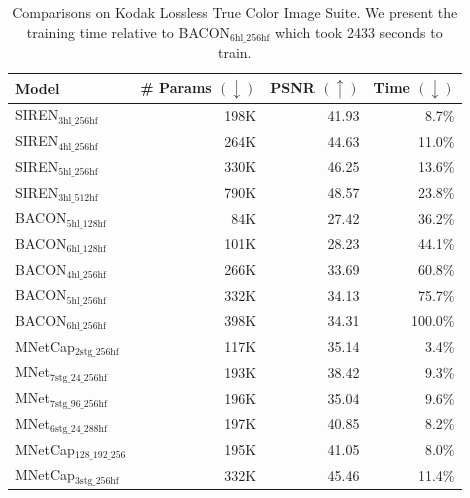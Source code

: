 \begin{table}[!h]
\centering
\small
\begin{tabular}{|l|r|r|r|}
\hline
Model                    & \# Params $(\downarrow)$ & PSNR $(\uparrow)$ & Time $(\downarrow)$ \\
\hline
SIREN$_\text{3hl\_256hf}$        & 198K      & 41.93    & 8.7\%       \\
SIREN$_\text{4hl\_256hf}$        & 264K      & 44.63    & 11.0\%      \\
SIREN$_\text{5hl\_256hf}$        & 330K      & 46.25    & 13.6\%      \\
SIREN$_\text{3hl\_512hf}$        & 790K      & 48.57    & 23.8\%      \\
\hline
BACON$_\text{5hl\_128hf}$        & 84K       & 27.42    & 36.2\%      \\
BACON$_\text{6hl\_128hf}$        & 101K      & 28.23    & 44.1\%      \\
BACON$_\text{4hl\_256hf}$        & 266K      & 33.69    & 60.8\%      \\
BACON$_\text{5hl\_256hf}$        & 332K      & 34.13    & 75.7\%      \\
BACON$_\text{6hl\_256hf}$        & 398K      & 34.31    & 100.0\%     \\
\hline
MNetCap$_\text{2stg\_256hf}$    & 117K      & 35.14    & 3.4\%       \\
MNet$_\text{7stg\_24\_256hf}$          & 193K      & 38.42    & 9.3\%       \\
MNet$_\text{7stg\_96\_256hf}$          & 196K      & 35.04    & 9.6\%       \\
MNet$_\text{6stg\_24\_288hf}$          & 197K      & 40.85    & 8.2\%       \\
MNetCap$_\text{128\_192\_256}$ & 195K      & 41.05    & 8.0\%       \\
MNetCap$_\text{3stg\_256hf}$           & 332K      & 45.46    & 11.4\%     \\
\hline
\end{tabular}
\vspace{-0.1cm}
\caption{\label{tab:kodak} Comparisons on Kodak Lossless True Color Image Suite. We present the training time relative to BACON$_\text{6hl\_256hf}$ which took 2433 seconds to train.}
\label{t:kodak}
\end{table}


